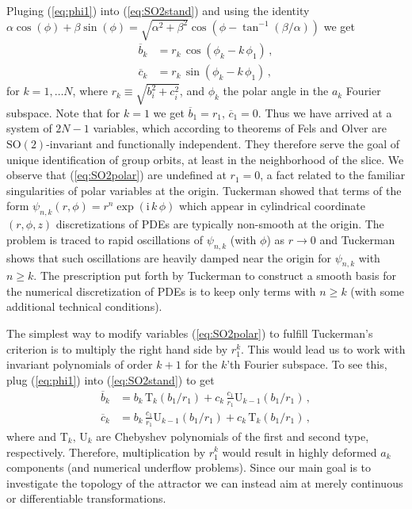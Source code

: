 \documentclass[aip,cha,showpacs,reprint]{revtex4-1} %
\newcommand{\bseq}{\begin{subequations}}
\newcommand{\eseq}{\end{subequations}}
\newcommand{\rf}     [1] {\cite{#1}}
\newcommand{\refeq}  [1] {(\ref{#1})}
\newcommand{\SOn}[1]{\ensuremath{\textrm{SO}(#1)}}         %
\newcommand{\chebT}{\mathrm{T}}
\newcommand{\chebU}{\mathrm{U}}
\newcommand{\ii}{\ensuremath{\mathrm{i}}} %
\begin{document}
Pluging \refeq{eq:phi1} into \refeq{eq:SO2stand} and using
the identity
$\alpha\cos(\phi)+\beta\sin(\phi)=\sqrt{\alpha^2+\beta^2}\cos(\phi-\tan^{-1}(\beta/\alpha))$
we get
\bseq\label{eq:SO2polar}
  \begin{align}
    \overline{b}_k &=
		    r_k\, \cos(\phi_k-k\,\phi_1)\,, \label{eq:SO2polar1}\\
    \overline{c}_k &=
		    r_k\, \sin(\phi_k-k\,\phi_1)\,,\label{eq:SO2polar2}
  \end{align}
\eseq
for $k=1,\ldots N$, where $r_k\equiv\sqrt{b_i^2+c_i^2}$, and
$\phi_k$ the polar angle in the $a_k$ Fourier subspace.
Note that for $k=1$ we get $\overline{b}_1=r_1,\, \overline{c}_1=0$.
Thus we have arrived at a system of $2N-1$ variables, which according to
theorems of Fels and Olver\rf{FelsOlver98,FelsOlver99} are
$\SOn{2}$-invariant and functionally independent. They therefore serve the goal
of unique identification of group orbits, at least in the neighborhood of the
slice. We observe that \refeq{eq:SO2polar} are undefined at $r_1=0$,
a fact related to the familiar singularities of polar variables at the origin.
Tuckerman\rf{tuckerman89} showed that terms of the form $\psi_{n,k}(r,\phi)=r^n\exp(\ii\, k\,\phi)$
which appear in cylindrical coordinate $(r,\phi,z)$ discretizations of PDEs
are typically non-smooth at the origin. The problem is traced to rapid
oscillations of $\psi_{n,k}$ (with $\phi$) as $r\rightarrow0$ and Tuckerman\rf{tuckerman89} shows
that such oscillations are heavily damped near the origin for
$\psi_{n,k}$ with $n\geq k$. The prescription put forth by Tuckerman\rf{tuckerman89} to
construct a smooth basis for the numerical discretization of
PDEs is to keep only terms with $n\geq k$ (with some additional technical conditions).

The simplest way to modify variables \refeq{eq:SO2polar} to fulfill Tuckerman's
criterion is to multiply the right hand side by $r_1^k$. This would lead us to
work with invariant polynomials of order $k+1$ for the $k$'th Fourier subspace.
To see this, plug \refeq{eq:phi1} into \refeq{eq:SO2stand} to get
\bseq\label{eq:SO2cheb}
  \begin{align}
    \overline{b}_k &=
		    b_k\, \chebT_k\left(b_1/r_1\right)+
		    c_k\,\frac{c_1}{r_1} \chebU_{k-1}\left(b_1/r_1\right)\,, \label{eq:SO2cheb1}\\
    \overline{c}_k &=
		    b_k\, \frac{c_1}{r_1} \chebU_{k-1}\left(b_1/r_1\right)+
		    c_k\,\chebT_k\left(b_1/r_1\right)\,,  \label{eq:SO2cheb2}
  \end{align}
\eseq
where and $\chebT_k,\,\chebU_k$ are Chebyshev polynomials of the first and second type, respectively.
Therefore, multiplication by $r_1^k$ would result in highly deformed $a_k$ components
(and numerical underflow problems). Since our main goal is to investigate the
topology of the attractor we can instead aim at merely continuous or
differentiable transformations.
\end{document}
